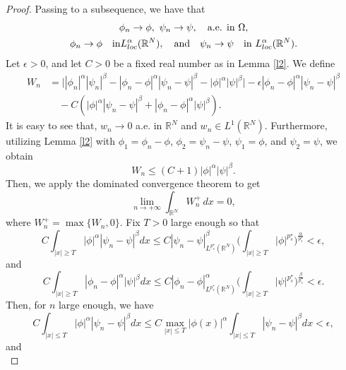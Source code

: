 \documentclass[10pt,a4paper]{amsart}
\numberwithin{equation}{section}
\begin{document}
\begin{proof}
Passing to a subsequence, we have that
\begin{gather*}
\phi_n\to \phi,\ \psi_n\to \psi,\quad \text{a.e. in } \Omega,\\
\phi_n\to \phi\quad \text{in}  L^\alpha_{\rm loc}(\mathbb{R}^N), \quad\text{and}\quad
\psi_n\to \psi\quad \text{in } L^\alpha_{\rm loc}(\mathbb{R}^N).
\end{gather*}
Let $\epsilon>0$, and let $C>0$ be a fixed real number as in Lemma \ref{l2}. We define
\begin{equation} \label{u0}
\begin{aligned}
W_n&=\Big||\phi_n|^\alpha|\psi_n|^\beta-|\phi_n-\phi|^\alpha|\psi_n-\psi|^\beta
 -|\phi|^\alpha|\psi|^\beta\Big|-\epsilon |\phi_n-\phi|^\alpha|\psi_n-\psi|^\beta  \\
&\quad -C(|\phi|^\alpha|\psi_n-\psi|^\beta+|\phi_n-\phi|^\alpha|\psi|^\beta).
\end{aligned}
\end{equation}
It is easy to see that, $w_n\to 0$ a.e. in $\mathbb{R}^N$ and $w_n\in L^1(\mathbb{R}^N)$.
Furthermore, utilizing Lemma \ref{l2} with $\phi_1=\phi_n-\phi$, $\phi_2=\psi_n-\psi$,
$\psi_1=\phi$, and $\psi_2=\psi$, we obtain
\[
W_n\leq (C+1) |\phi|^\alpha|\psi|^\beta.
\]
Then, we apply the dominated convergence theorem to get
\begin{equation}\label{u1}
\lim_{n\to +\infty}\int_{\mathbb{R}^N}W_n^+\,dx=0,
\end{equation}
where $W_n^+=\max\lbrace W_n,0\rbrace$. Fix $T>0$ large enough so that
\begin{equation}\label{u2}
C\int_{|x|\geq T}|\phi|^\alpha|\psi_n-\psi|^\beta dx\leq C |\psi_n-\psi|^\beta_{L^{p^\star_s}(\mathbb{R}^N)}\Big(\int_{|x|\geq T}|\phi|^{p^\star_s}\Big)^\frac{\alpha}{{p^\star_s}}<\epsilon,
\end{equation}
and
\begin{equation}\label{u3}
C\int_{|x|\geq T}|\phi_n-\phi|^\alpha|\psi|^\beta dx\leq C |\phi_n-\phi|^\alpha_{L^{p^\star_s}(\mathbb{R}^N)}\Big(\int_{|x|\geq T}|\psi|^{p^\star_s}\Big)^\frac{\beta}{{p^\star_s}}<\epsilon.
\end{equation}
Then, for $n$ large enough, we have
\begin{equation}\label{u4}
C\int_{|x|\leq T}|\phi|^\alpha|\psi_n-\psi|^\beta dx\leq C \max_{|x|\leq T}|\phi(x)|^\alpha \int_{|x|\leq T}|\psi_n-\psi|^\beta dx <\epsilon,
\end{equation}
and
\begin{equation}\label{u5}

\end{equation}
\end{proof}
\end{document}
